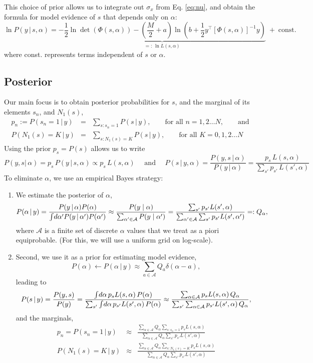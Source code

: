 \documentclass[letter,10pt,oneside]{article}
\newcommand{\bel}{\begin{equation}}
\newcommand{\eel}{\end{equation}}
\newcommand{\be}{\begin{equation*}}
\newcommand{\ee}{\end{equation*}}
\newcommand{\bal}{\begin{eqnarray}}
\newcommand{\eal}{\end{eqnarray}}
\newcommand{\ba}{\begin{eqnarray*}}
\newcommand{\ea}{\end{eqnarray*}}
\newcommand{\+}{^\dagger}
\newcommand{\T}{^\top}
\newcommand{\refeq}[1]{Eq. \ref{#1}}
\begin{document}
This choice of prior allows us to integrate out $\sigma_x$ from \refeq{eq:nu}, and obtain the formula for model evidence of $s$ that depends only on $\alpha$:
\bel
\label{eq:evidence}
  \ln P(y\,|\, s, \alpha) = \underbrace{-\frac{1}{2}\ln\det(\Phi(s,\alpha)) - \left(\frac{M}{2} + a\right)\ln\left(b + \frac{1}{2}y\T [\Phi(s,\alpha)]^{-1} y\right)}_{=:\, \ln L(s, \alpha)} \;+\; \text{const.}
\eel
where const. represents terms independent of $s$ or $\alpha$.


\subsection{Posterior}
\label{sec:posterior}
Our main focus is to obtain posterior probabilities for $s$, and the marginal of its elements $s_n$, and $N_1(s)$,
\ba
  p_n := P(s_n = 1\,|\, y) &=& \sum_{s: s_n = 1} P(s\,|\, y),\qquad \text{for all }n = 1,2\ldots N,\qquad \text{and} \\
  P(N_1(s) = K\,|\, y) &=& \sum_{s: N_1(s) = K} P(s\,|\, y),\qquad \text{for all }K = 0, 1,2\ldots N
\ea
Using the prior $p_s = P(s)$ allows us to write
\be
  P(y,s|\,\alpha) = p_s\,P(y\,|\,s, \alpha) \propto p_s\,L(s,\alpha) \quad \text{ and } \quad 
  P(s\,|\,y, \alpha) = \frac{P(y,s\,|\,\alpha)}{P(y\,|\,\alpha)} = \frac{p_s\,L(s, \alpha)}{\sum_{s'} p_{s'}\,L(s', \alpha)}
\ee
To eliminate $\alpha$, we use an empirical Bayes strategy: 

\begin{enumerate} 
  \item We estimate the posterior of $\alpha$,
  \be
    P(\alpha\,|\,y) = \frac{P(y\,|\,\alpha)P(\alpha)}{\intop\! d\alpha'P(y\,|\,\alpha')P(\alpha')} \approx \frac{P(y\;|\;\alpha)}{\sum_{\alpha'\in\mathcal{A}}P(y\;|\;\alpha')} = \frac{\sum_{s'} p_{s'}L(s', \alpha)}{\sum_{\alpha'\in\mathcal{A}}\sum_{s'} p_{s'}L(s', \alpha')} =: Q_\alpha,
  \ee
  where $\mathcal{A}$ is a finite set of discrete $\alpha$ values that we treat as a piori equiprobable. (For this, we will use a uniform grid on log-scale).

  \item Second, we use it as a prior for estimating model evidence,
  \be
    P(\alpha) \leftarrow P(\alpha\,|\,y) \approx \sum_{a\in \mathcal{A}} Q_a \delta(\alpha - a),
  \ee
  leading to
  \bel
    P(s\,|\,y) = \frac{P(y, s)}{P(y)} = \frac{\intop\! d \alpha\, p_s L(s, \alpha)\,P(\alpha)}{\sum_{s'}\intop\! d \alpha\, p_{s'} L(s', \alpha)\,P(\alpha)} \approx \frac{\sum_{\alpha \in \mathcal{A}} p_s L(s, \alpha) \,Q_\alpha}{\sum_{s'}\sum_{\alpha \in \mathcal{A}} p_{s'} L(s', \alpha) \,Q_\alpha},
  \eel
  and the marginals,
  \bal
    p_n = P(s_n = 1\,|\,y) &\approx & \frac{\sum_{\alpha \in \mathcal{A}} Q_\alpha \sum_{s:s_n=1} p_s L(s, \alpha)}{\sum_{\alpha \in \mathcal{A}} Q_\alpha \sum_{s'}p_{s'}L(s', \alpha)} \\
    P(N_1(s) = K\,|\,y) &\approx & \frac{\sum_{\alpha \in \mathcal{A}} Q_\alpha \sum_{s:N_1(s)=K} p_s L(s, \alpha)}{\sum_{\alpha \in \mathcal{A}} Q_\alpha \sum_{s'}p_{s'}L(s', \alpha)}
  \eal

\end{enumerate}
\end{document}
